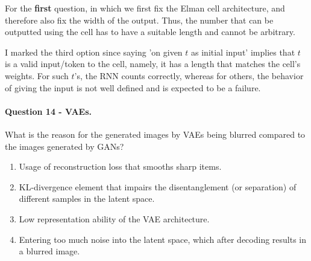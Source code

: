 \documentclass{article}
\begin{document}
For the \textbf{first} question, in which we first fix the Elman cell architecture, and therefore also fix the width of the output. Thus, the number that can be outputted using the cell has to have a suitable length and cannot be arbitrary.

I marked the third option since saying 'on given $t$ as initial input' implies that $t$ is a valid input/token to the cell, namely, it has a length that matches the cell's weights. For such $t$'s, the RNN counts correctly, whereas for others, the behavior of giving the input is not well defined and is expected to be a failure.


\paragraph{Question 14 - VAEs.} What is the reason for the generated images by VAEs being blurred compared to the images generated by GANs?   
\begin{enumerate}
  \item Usage of reconstruction loss that smooths sharp items.   
  \item KL-divergence element that impairs the disentanglement (or separation) of different samples in the latent space. 
  \item Low representation ability of the VAE architecture. 
  \item Entering too much noise into the latent space, which after decoding results in a blurred image. 
\end{enumerate}
\end{document}

